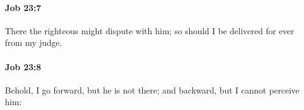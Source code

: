 		\paragraph{Job 23:7} %
			\label{JOB-23-7}

			There the righteous might dispute with him; so should I be delivered for ever from my judge.


		\paragraph{Job 23:8} %
			\label{JOB-23-8}

			Behold, I go forward, but he is not there; and backward, but I cannot perceive him:


